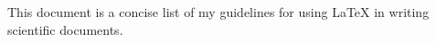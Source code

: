 This document is a concise list of my guidelines for using \LaTeX{} in writing  
scientific documents. 
